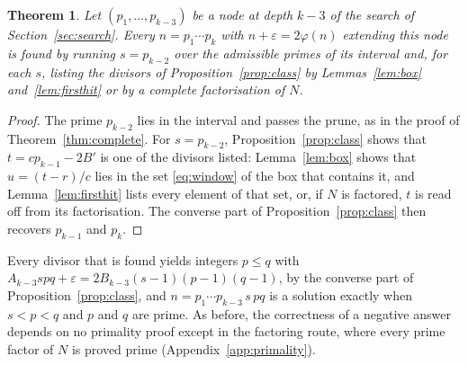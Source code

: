 \documentclass[11pt,reqno]{amsart}
\numberwithin{equation}{section}
\theoremstyle{plain}
\newtheorem{theorem}{Theorem}[section]
\theoremstyle{definition}
\theoremstyle{remark}
\begin{document}
\begin{theorem}\label{thm:three}
Let $(p_1,\dots,p_{k-3})$ be a node at depth $k-3$ of the search of
Section~\ref{sec:search}. Every $n=p_1\cdots p_k$ with
$n+\varepsilon=2\varphi(n)$ extending this node is found by running
$s=p_{k-2}$ over the admissible primes of its interval and, for each
$s$, listing the divisors of Proposition~\ref{prop:class} by
Lemmas~\ref{lem:box} and~\ref{lem:firsthit} or by a complete
factorisation of $N$.
\end{theorem}

\begin{proof}
The prime $p_{k-2}$ lies in the interval and passes the prune, as in
the proof of Theorem~\ref{thm:complete}. For $s=p_{k-2}$,
Proposition~\ref{prop:class} shows that $t=cp_{k-1}-2B'$ is one of the
divisors listed: Lemma~\ref{lem:box} shows that $u=(t-r)/c$ lies in
the set \eqref{eq:window} of the box that contains it, and
Lemma~\ref{lem:firsthit} lists every element of that set, or, if
$N$ is factored, $t$ is read off from its factorisation. The converse part of
Proposition~\ref{prop:class} then recovers $p_{k-1}$ and $p_k$.
\end{proof}

Every divisor that is found yields integers $p\le q$ with
$A_{k-3}spq+\varepsilon=2B_{k-3}(s-1)(p-1)(q-1)$, by the converse part
of Proposition~\ref{prop:class}, and $n=p_1\cdots p_{k-3}\,s\,pq$ is a
solution exactly when $s<p<q$ and $p$ and $q$ are prime. As before, the correctness of a
negative answer depends on no primality proof except in the factoring
route, where every prime factor of $N$ is proved prime
(Appendix~\ref{app:primality}).
\end{document}
